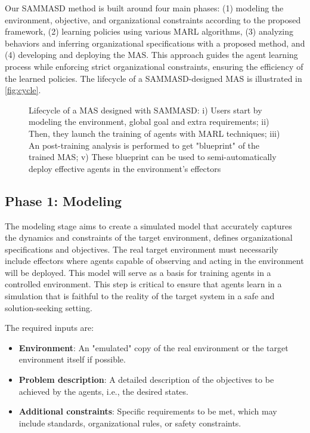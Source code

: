 \documentclass[sigconf,anonymous]{aamas}
\begin{document}
Our SAMMASD method is built around four main phases: (1) modeling the environment, objective, and organizational constraints according to the proposed framework, (2) learning policies using various MARL algorithms, (3) analyzing behaviors and inferring organizational specifications with a proposed method, and (4) developing and deploying the MAS. This approach guides the agent learning process while enforcing strict organizational constraints, ensuring the efficiency of the learned policies. The lifecycle of a SAMMASD-designed MAS is illustrated in \autoref{fig:cycle}.



\begin{figure}[h!]
  \centering
  
  \caption{Lifecycle of a MAS designed with SAMMASD: i) Users start by modeling the environment, global goal and extra requirements; \quad ii) Then, they launch the training of agents with MARL techniques; \quad iii) An post-training analysis is performed to get "blueprint" of the trained MAS; \quad v) These blueprint can be used to semi-automatically deploy effective agents in the environment's effectors}
  \label{fig:cycle}
\end{figure}

\subsection{Phase 1: Modeling}

The modeling stage aims to create a simulated model that accurately captures the dynamics and constraints of the target environment, defines organizational specifications and objectives. The real target environment must necessarily include effectors where agents capable of observing and acting in the environment will be deployed. This model will serve as a basis for training agents in a controlled environment. This step is critical to ensure that agents learn in a simulation that is faithful to the reality of the target system in a safe and solution-seeking setting.

The required inputs are:
\begin{itemize}
    \item \textbf{Environment}: An "emulated" copy of the real environment or the target environment itself if possible.
    \item \textbf{Problem description}: A detailed description of the objectives to be achieved by the agents, i.e., the desired states.
    \item \textbf{Additional constraints}: Specific requirements to be met, which may include standards, organizational rules, or safety constraints.
\end{itemize}
\end{document}
